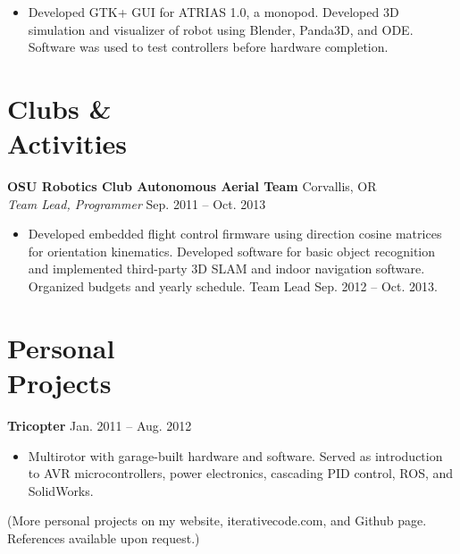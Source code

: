 \documentclass[10pt,letterpaper,margin]{res}
\begin{document}
\begin{resume}
\begin{itemize}
	\item Developed GTK+ GUI for ATRIAS 1.0, a monopod. Developed 3D simulation
		and visualizer of robot using Blender, Panda3D, and ODE. Software was
		used to test controllers before hardware completion.
\end{itemize}



\section{Clubs \& \\ Activities}

{\bf OSU Robotics Club Autonomous Aerial Team} \hfill {\color{lightgray} Corvallis, OR} \\
{\it Team Lead, Programmer} \hfill {\color{lightgray} Sep. 2011 -- Oct. 2013}\vspace{0.2em}

\begin{itemize}
	\item Developed embedded flight control firmware using direction cosine
		matrices for orientation kinematics. Developed software for basic
		object recognition and implemented third-party 3D SLAM and indoor
		navigation software. Organized budgets and yearly schedule. Team Lead
		Sep. 2012 -- Oct. 2013.
\end{itemize}



\section{Personal \\ Projects}

{\bf Tricopter} \hfill {\color{lightgray} Jan. 2011 -- Aug. 2012}\vspace{0.2em}

\begin{itemize}
	\item Multirotor with garage-built hardware and software. Served as
		introduction to AVR microcontrollers, power electronics, cascading PID
		control, ROS, and SolidWorks.
\end{itemize}

{\footnotesize (More personal projects on my website, iterativecode.com, and
Github page. References available upon request.)}


% 

\end{resume}
\end{document}
